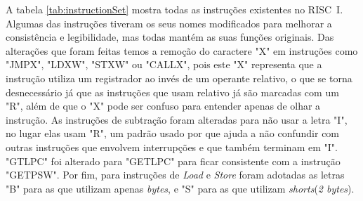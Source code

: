 \documentclass[
	article,			%
	11pt,				%
	oneside,			%
	a4paper,			%
	english,			%
	brazil,				%
	sumario=tradicional
	]{abntex2}
\begin{document}
A tabela \ref{tab:instructionSet} mostra todas as instruções existentes no RISC~I. Algumas das instruções tiveram os seus nomes modificados para melhorar a consistência e legibilidade, mas todas mantém as suas funções originais. Das alterações que foram feitas temos a remoção do caractere "X" em instruções como "JMPX", "LDXW", "STXW" ou "CALLX", pois este "X" representa que a instrução utiliza um registrador ao invés de um operante relativo, o que se torna desnecessário já que as instruções que usam relativo já são marcadas com um "R", além de que o "X" pode ser confuso para entender apenas de olhar a instrução. As instruções de subtração foram alteradas para não usar a letra "I", no lugar elas usam "R", um padrão usado por  que ajuda a não confundir com outras instruções que envolvem interrupções e que também terminam em "I". "GTLPC" foi alterado para "GETLPC" para ficar consistente com a instrução "GETPSW". Por fim, para instruções de \textit{Load} e \textit{Store} foram adotadas as letras "B" para as que utilizam apenas \textit{bytes}, e "S" para as que utilizam \textit{shorts}(\textit{2 bytes}).
\end{document}
